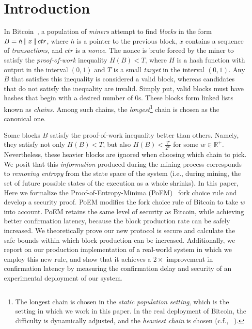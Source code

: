 \section{Introduction}

In Bitcoin~\cite{bitcoin}, a population of \emph{miners}
attempt to find \emph{blocks} in the form $B = h \,\|\, x \,\|\, ctr$,
where $h$ is a pointer to the previous block, $x$ contains a sequence of
\emph{transactions}, and $ctr$ is a \emph{nonce}. The nonce is brute forced
by the miner to satisfy the \emph{proof-of-work} inequality $H(B) < T$, where
$H$ is a hash function with output in the interval $(0, 1)$
and $T$ is a small \emph{target} in the interval $(0, 1)$. Any $B$ that satisfies this
inequality is considered a valid block, whereas candidates that do not satisfy
the inequality are invalid. Simply put, valid blocks must have
hashes that begin with a desired number of $0$s.
These blocks form linked lists known as \emph{chains}.
Among such chains, the \emph{longest}\footnote{The
longest chain is chosen in the \emph{static population setting}, which is the
setting in which we work in this paper. In the real deployment of Bitcoin, the
difficulty is dynamically adjusted, and the \emph{heaviest chain} is chosen (c.f.,
~\cite{varbackbone}).} chain is chosen as the canonical one.

Some blocks $B$ satisfy the proof-of-work inequality better than others.
Namely, they satisfy not only $H(B) < T$, but also $H(B) < \frac{T}{2^w}$
for some $w \in \mathbb{R}^+$. Nevertheless, these heavier blocks are ignored when choosing
which chain to pick. We posit that this \emph{information}
produced during the mining process corresponds to \emph{removing entropy} from the
state space of the system (i.e., during mining, the set of future possible states
of the execution as a whole shrinks).
In this paper, Here we formalize the Proof-of-Entropy-Minima (PoEM)~\cite{poem} fork choice rule and develop a security proof.
PoEM modifies the fork choice rule of Bitcoin to take $w$ into account.
PoEM retains the same level of security as Bitcoin, while achieving
better confirmation latency, because the block production rate can be safely increased.
We theoretically prove our new protocol is secure and calculate the safe
bounds within which block production can be increased.
Additionally, we report on our production implementation of a real-world system
in which we employ this new rule, and show that it achieves a $2\times$ 
improvement in confirmation latency by measuring the confirmation delay and security
of an experimental deployment of our system. 

